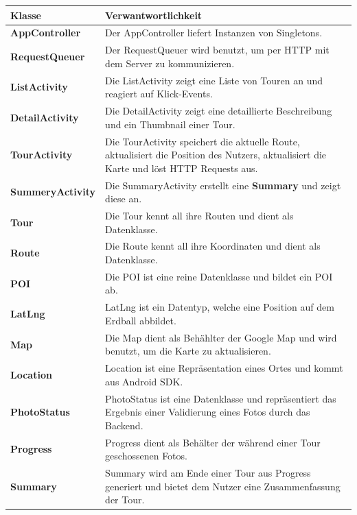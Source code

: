 \documentclass[a4paper,10pt,xetex]{article}
\begin{document}
\begin{longtabu} to \textwidth { | l | X[l] |  }
\hline
\textbf{Klasse} & \textbf{Verwantwortlichkeit}\\\hline
\endhead
\textbf{AppController} & Der AppController liefert Instanzen von Singletons.\\\hline
\textbf{RequestQueuer} & Der RequestQueuer wird benutzt, um per HTTP mit dem
Server zu kommunizieren.\\\hline
\textbf{ListActivity} & Die ListActivity zeigt eine Liste von Touren an und
reagiert auf Klick-Events.\\\hline
\textbf{DetailActivity} & Die DetailActivity zeigt eine detaillierte Beschreibung
und ein Thumbnail einer Tour.\\\hline
\textbf{TourActivity} & Die TourActivity speichert die aktuelle Route, aktualisiert
die Position des Nutzers, aktualisiert die Karte und löst HTTP Requests aus.\\\hline
\textbf{SummeryActivity} & Die SummaryActivity erstellt eine \textbf{Summary}
und zeigt diese an.\\\hline
\textbf{Tour} & Die Tour kennt all ihre Routen und dient als Datenklasse. \\\hline
\textbf{Route} & Die Route kennt all ihre Koordinaten und dient als
Datenklasse. \\\hline
\textbf{POI} & Die POI ist eine reine Datenklasse und bildet ein POI ab.\\\hline
\textbf{LatLng} & LatLng ist ein Datentyp, welche eine Position auf dem
Erdball abbildet.\\\hline
\textbf{Map} & Die Map dient als Behählter der Google Map und wird benutzt, um
die Karte zu aktualisieren.\\\hline
\textbf{Location} & Location ist eine Repräsentation eines Ortes und kommt aus
Android SDK.\\\hline
\textbf{PhotoStatus} & PhotoStatus ist eine Datenklasse und repräsentiert das
Ergebnis einer Validierung eines Fotos durch das Backend.\\\hline
\textbf{Progress} & Progress dient als Behälter der während einer Tour geschossenen
Fotos.\\\hline
\textbf{Summary} & Summary wird am Ende einer Tour aus Progress generiert und
bietet dem Nutzer eine Zusammenfassung der Tour.\\\hline
\end{longtabu}

\newpage
\end{document}

